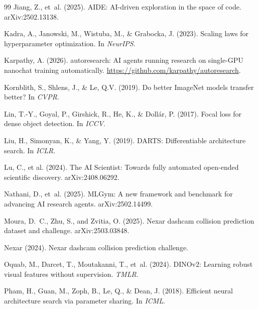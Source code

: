 \documentclass{article}
\begin{document}
\begin{thebibliography}{99}
Jiang, Z., et~al. (2025).
\newblock AIDE: AI-driven exploration in the space of code.
\newblock arXiv:2502.13138.

Kadra, A., Janowski, M., Wistuba, M., \& Grabocka, J. (2023).
\newblock Scaling laws for hyperparameter optimization.
\newblock In \emph{NeurIPS}.

Karpathy, A. (2026).
\newblock autoresearch: AI agents running research on single-GPU nanochat training automatically.
\newblock \url{https://github.com/karpathy/autoresearch}.

Kornblith, S., Shlens, J., \& Le, Q.V. (2019).
\newblock Do better ImageNet models transfer better?
\newblock In \emph{CVPR}.

Lin, T.-Y., Goyal, P., Girshick, R., He, K., \& Doll{\'a}r, P. (2017).
\newblock Focal loss for dense object detection.
\newblock In \emph{ICCV}.

Liu, H., Simonyan, K., \& Yang, Y. (2019).
\newblock DARTS: Differentiable architecture search.
\newblock In \emph{ICLR}.

Lu, C., et al. (2024).
\newblock The AI Scientist: Towards fully automated open-ended scientific discovery.
\newblock arXiv:2408.06292.

Nathani, D., et~al. (2025).
\newblock MLGym: A new framework and benchmark for advancing AI research agents.
\newblock arXiv:2502.14499.

Moura, D.~C., Zhu, S., and Zvitia, O. (2025).
\newblock Nexar dashcam collision prediction dataset and challenge.
\newblock arXiv:2503.03848.

Nexar (2024).
\newblock Nexar dashcam collision prediction challenge.

Oquab, M., Darcet, T., Moutakanni, T., et~al. (2024).
\newblock DINOv2: Learning robust visual features without supervision.
\newblock \emph{TMLR}.

Pham, H., Guan, M., Zoph, B., Le, Q., \& Dean, J. (2018).
\newblock Efficient neural architecture search via parameter sharing.
\newblock In \emph{ICML}.


\end{thebibliography}
\end{document}
